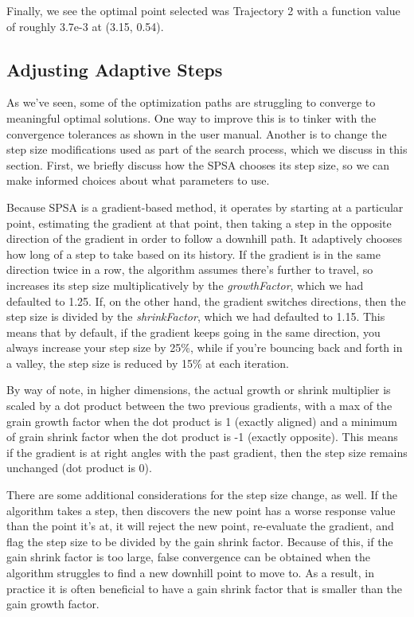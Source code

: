 Finally, we see the optimal point selected was Trajectory 2 with a function value of roughly 3.7e-3
at (3.15, 0.54).

\subsection{Adjusting Adaptive Steps} \label{subsec:opt stepsize}
As we've seen, some of the optimization paths are struggling to converge to meaningful optimal solutions.
One way to improve this is to tinker with the convergence tolerances as shown in the user manual.  Another is
to change the step size modifications used as part of the search process, which we discuss in this section.
First, we briefly discuss how the SPSA chooses its step size, so we can make informed choices about what
parameters to use.

Because SPSA is a gradient-based method, it operates by starting at a particular point, estimating the
gradient at that point, then taking a step in the opposite direction of the gradient in order to follow a
downhill path.  It adaptively chooses how long of a step to take based on its history.  If the gradient is in
the same direction twice in a row, the algorithm assumes there's further to travel, so increases its step size
multiplicatively by the \emph{growthFactor}, which we had defaulted to 1.25.  If, on the other hand,
the gradient switches directions, then the step size is divided by the \emph{shrinkFactor}, which we
had defaulted to 1.15.  This means that by default, if the gradient keeps going in the same direction, you
always increase your step size by 25\%, while if you're bouncing back and forth in a valley, the
step size is reduced by 15\% at each iteration.

By way of note, in higher dimensions, the actual growth or shrink multiplier is scaled by a dot product
between the two previous gradients, with a max of the grain growth factor when the dot product is 1 (exactly
aligned) and a minimum of grain shrink factor when the dot product is -1 (exactly opposite).  This means if
the gradient is at right angles with the past gradient, then the step size remains unchanged (dot product is
0).

There are some additional considerations for the step size change, as well.  If the algorithm takes a step,
then discovers the new point has a worse response value than the point it's at, it will reject the new point,
re-evaluate the gradient, and flag the step size to be divided by the gain shrink factor.  Because of this, if
the gain shrink factor is too large, false convergence can be obtained when the algorithm struggles to find a
new downhill point to move to.  As a result, in practice it is often beneficial to have a gain shrink factor
that is smaller than the gain growth factor.

